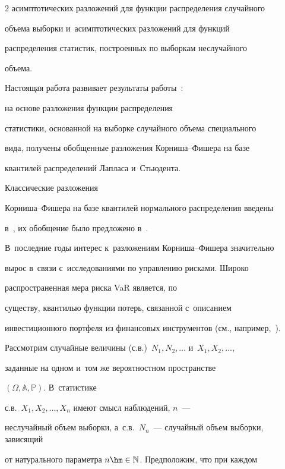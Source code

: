 \begin{multicols}{2}
асимптотических разложений для функции распределения случайного

объема выборки и~асимптотических разложений для функций

распределения  статистик, построенных по выборкам неслучайного

объема. 



Настоящая работа раз\-вивает результаты ра\-боты~\cite{BenKorGal}: 

на основе раз\-ложения функции распределения

статистики, основанной на выборке случайного объема специального

вида, получены обобщенные разложения Кор\-ни\-ша--Фи\-ше\-ра на базе

квантилей распределений Лапласа и~Стью\-дента. 

{ %



}



Классические разложения

Кор\-ни\-ша--Фи\-ше\-ра на базе квантилей нормального  распределения введены

в~\cite{CornFish}, их обобщение было предложено в~\cite{HillDavis}.

В~последние годы интерес к~разложениям Кор\-ни\-ша--Фи\-ше\-ра значительно

вырос в~связи с~исследованиями по управ\-ле\-нию рисками. Широко

распространенная мера риска VaR является, по

существу, квантилью функции потерь, связанной с~описанием

инвестиционного портфеля из  финансовых инструментов (см., например,~\cite{Jashke}).





Рассмотрим случайные величины (с.в.)\ $N_{1}, N_{2}, \ldots$ и~$X_1, X_2, \ldots$, 

заданные на одном и~том же вероятностном пространстве 

$\left(\Omega,\mathbb{A},\mathbb{P}\right)$. В~статистике 

с.в.~$X_1, X_2, \ldots, X_n$ имеют смысл наблюдений, $n$~--- 

неслучайный объем выборки, а~с.в.~$N_n$~--- случайный объем выборки, зависящий 

от натурального параметра $n \hm\in \mathbb{N}$. Предположим, что при каждом 


\end{multicols}
